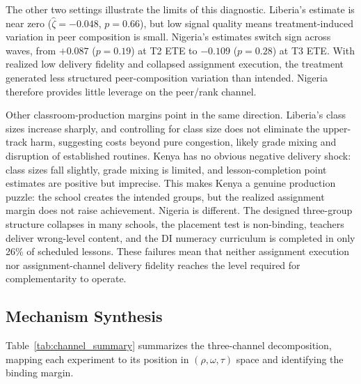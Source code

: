 \documentclass[11pt]{article}
\begin{document}
The other two settings illustrate the limits of this diagnostic. Liberia's estimate is near zero ($\hat{\zeta}=-0.048$, $p=0.66$), but low signal quality means treatment-induced variation in peer composition is small. Nigeria's estimates switch sign across waves, from $+0.087$ ($p=0.19$) at T2 ETE to $-0.109$ ($p=0.28$) at T3 ETE. With realized low delivery fidelity and collapsed assignment execution, the treatment generated less structured peer-composition variation than intended. Nigeria therefore provides little leverage on the peer/rank channel.

Other classroom-production margins point in the same direction. Liberia's class sizes increase sharply, and controlling for class size does not eliminate the upper-track harm, suggesting costs beyond pure congestion, likely grade mixing and disruption of established routines. Kenya has no obvious negative delivery shock: class sizes fall slightly, grade mixing is limited, and lesson-completion point estimates are positive but imprecise. This makes Kenya a genuine production puzzle: the school creates the intended groups, but the realized assignment margin does not raise achievement. Nigeria is different. The designed three-group structure collapses in many schools, the placement test is non-binding, teachers deliver wrong-level content, and the DI numeracy curriculum is completed in only 26\% of scheduled lessons. These failures mean that neither assignment execution nor assignment-channel delivery fidelity reaches the level required for complementarity to operate.

\subsection{Mechanism Synthesis}

Table~\ref{tab:channel_summary} summarizes the three-channel decomposition, mapping each experiment to its position in $(\rho, \omega, \tau)$ space and identifying the binding margin.
\end{document}
